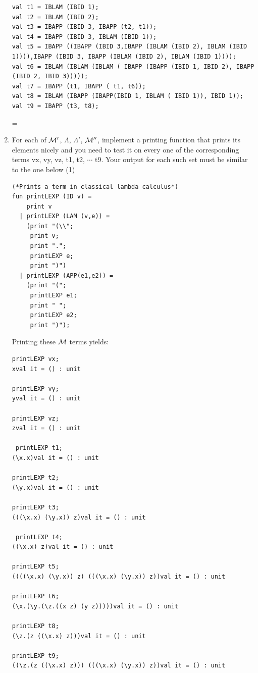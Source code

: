 \documentclass[11pt]{article}
\newenvironment{neverbreak} %
{\par\nobreak\vfil\penalty0\vfilneg
	\vtop\bgroup}
{\par\xdef\tpd{\the\prevdepth}\egroup
	\prevdepth=\tpd}
\begin{document}
\begin{enumerate}
\begin{neverbreak}
\begin{verbatim}
val t1 = IBLAM (IBID 1);
val t2 = IBLAM (IBID 2);
val t3 = IBAPP (IBID 3, IBAPP (t2, t1));
val t4 = IBAPP (IBID 3, IBLAM (IBID 1));
val t5 = IBAPP ((IBAPP (IBID 3,IBAPP (IBLAM (IBID 2), IBLAM (IBID 1)))),IBAPP (IBID 3, IBAPP (IBLAM (IBID 2), IBLAM (IBID 1))));
val t6 = IBLAM (IBLAM (IBLAM ( IBAPP (IBAPP (IBID 1, IBID 2), IBAPP (IBID 2, IBID 3)))));
val t7 = IBAPP (t1, IBAPP ( t1, t6));
val t8 = IBLAM (IBAPP (IBAPP(IBID 1, IBLAM ( IBID 1)), IBID 1));
val t9 = IBAPP (t3, t8);
\end{verbatim}
\end{neverbreak}

\pagebreak
\item
  For each of ${\cal M}'$, $\Lambda$, $\Lambda'$, ${\cal M}''$, implement a printing function that prints its elements nicely and you need to test it on every one of the corresponding terms  vx, vy, vz, t1, t2, $\cdots$ t9.  Your output for each such set must be similar to the one below \hfill{(1)} %
  
  \noindent
  \begin{verbatim}
(*Prints a term in classical lambda calculus*)
fun printLEXP (ID v) =
    print v
  | printLEXP (LAM (v,e)) =
    (print "(\\";
     print v;
     print ".";
     printLEXP e;
     print ")")
  | printLEXP (APP(e1,e2)) =
    (print "(";
     printLEXP e1;
     print " ";
     printLEXP e2;
     print ")");
\end{verbatim}  
Printing these  ${\cal M}$ terms yields:
\begin{verbatim}
printLEXP vx;
xval it = () : unit

printLEXP vy;
yval it = () : unit

printLEXP vz;
zval it = () : unit

 printLEXP t1;
(\x.x)val it = () : unit

printLEXP t2;
(\y.x)val it = () : unit

printLEXP t3;
(((\x.x) (\y.x)) z)val it = () : unit

 printLEXP t4;
((\x.x) z)val it = () : unit

printLEXP t5;
((((\x.x) (\y.x)) z) (((\x.x) (\y.x)) z))val it = () : unit

printLEXP t6;
(\x.(\y.(\z.((x z) (y z)))))val it = () : unit

printLEXP t8;
(\z.(z ((\x.x) z)))val it = () : unit

printLEXP t9;
((\z.(z ((\x.x) z))) (((\x.x) (\y.x)) z))val it = () : unit




\end{verbatim}
\end{enumerate}
\end{document}
